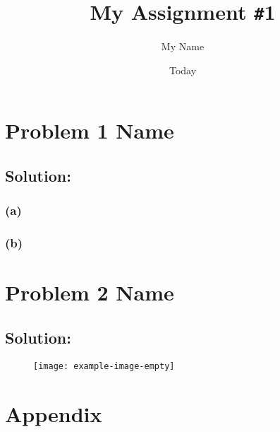 \documentclass[
	12pt, %
]{fphw_assignment_toc}
\title{My Assignment \texttt{\#}1}        %
\author{My Name}    %
\date{Today}        %
\institute{Department of Physics}              %
\begin{document}
\maketitle
{}           %
\newpage
{}
\tableofcontents
\newpage
{}          %


\section{Problem 1 Name~\cite{book:zettili}}
\begin{problem}
  \lipsum[1][5-6]
\end{problem}

\subsection{Solution:}
\blindtext
\subsubsection{(a)}
\lipsum[2][5]
\subsubsection{(b)}
\lipsum[3][5]

\section{Problem 2 Name~\cite{book:zettili}}
\begin{problem}
\lipsum[4][5-6]
\end{problem}

\subsection{Solution:}
\blindtext
\begin{figure}[!ht]
  \centering
  \texttt{[image: example-image-empty]}
  \caption{ \lipsum[5][2]\cite{book:griffiths}}
  \label{fig:fig1}
\end{figure}

\newpage
\section{Appendix}
\begin{problem}
  \centering  \lipsum[6][3]
\end{problem}
{\footnotesize
\blindtext \cite{book:balakrishnan}
}

\newpage
{}   %
\printbibliography[heading=bibintoc, title={References}]
\end{document}
